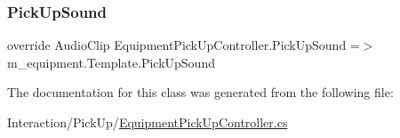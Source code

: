 \subsubsection{\texorpdfstring{Pick\+Up\+Sound}{PickUpSound}}
{\footnotesize\ttfamily override Audio\+Clip Equipment\+Pick\+Up\+Controller.\+Pick\+Up\+Sound =$>$ m\+\_\+equipment.\+Template.\+Pick\+Up\+Sound}



The documentation for this class was generated from the following file\+:\begin{DoxyCompactItemize}
\item 
Interaction/\+Pick\+Up/\mbox{\hyperlink{_equipment_pick_up_controller_8cs}{Equipment\+Pick\+Up\+Controller.\+cs}}\end{DoxyCompactItemize}
